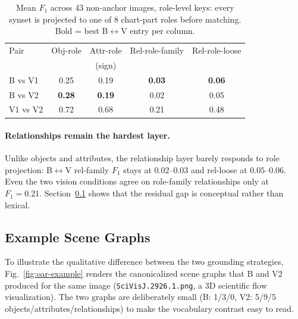 \begin{table}[h]
\centering
\caption{Mean $F_1$ across 43 non-anchor images, role-level keys:
every synset is projected to one of 8 chart-part roles before
matching. Bold = best B$\leftrightarrow$V entry per column.}
\label{tab:oar-role}
\footnotesize
\setlength{\tabcolsep}{3pt}
\begin{tabular*}{\linewidth}{@{\extracolsep{\fill}}lcccc@{}}
\toprule
Pair      & Obj-role      & Attr-role     & Rel-role-family & Rel-role-loose \\
          &               & (sign)        &                 &                \\
\midrule
B vs V1   & 0.25          & 0.19          & \textbf{0.03}   & \textbf{0.06} \\
B vs V2   & \textbf{0.28} & \textbf{0.19} & 0.02            & 0.05 \\
V1 vs V2  & 0.72          & 0.68          & 0.21            & 0.48 \\
\bottomrule
\end{tabular*}
\end{table}

\paragraph{Relationships remain the hardest layer.}
Unlike objects and attributes, the relationship layer barely
responds to role projection: B$\leftrightarrow$V rel-family $F_1$
stays at $0.02$--$0.03$ and rel-loose at $0.05$--$0.06$. Even the
two vision conditions agree on role-family relationships only at
$F_1 = 0.21$. Section~\ref{app:oar-example} shows that the
residual gap is conceptual rather than lexical.

\subsection{Example Scene Graphs}
\label{app:oar-example}

To illustrate the qualitative difference between the two grounding
strategies, Fig.~\ref{fig:oar-example} renders the canonicalized
scene graphs that B and V2 produced for the same image
(\texttt{SciVisJ.2926.1.png}, a 3D scientific flow visualization).
The two graphs are deliberately small
(B: 1/3/0, V2: 5/9/5 objects/attributes/relationships) to make the
vocabulary contrast easy to read.

